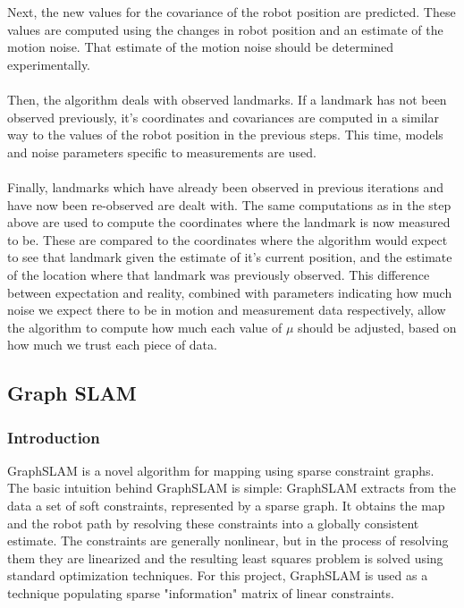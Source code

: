 \documentclass{ba-kecs}
\numberwithin{figure}{section}
\numberwithin{equation}{section}
\begin{document}
Next, the new values for the covariance of the robot position are predicted. These values are computed using the changes in robot position and an estimate of the motion noise. That estimate of the motion noise should be determined experimentally.\\\\
Then, the algorithm deals with observed landmarks. If a landmark has not been observed previously, it’s coordinates and covariances are computed in a similar way to the values of the robot position in the previous steps. This time, models and noise parameters specific to measurements are used.\\\\
Finally, landmarks which have already been observed in previous iterations and have now been re-observed are dealt with. The same computations as in the step above are used to compute the coordinates where the landmark is now measured to be. These are compared to the coordinates where the algorithm would expect to see that landmark given the estimate of it’s current position, and the estimate of the location where that landmark was previously observed. This difference between expectation and reality, combined with parameters indicating how much noise we expect there to be in motion and measurement data respectively, allow the algorithm to compute how much each value of $\mu$ should be adjusted, based on how much we trust each piece of data.\\

\subsection{Graph SLAM}

\subsubsection{Introduction}
GraphSLAM is a novel algorithm for mapping using sparse constraint graphs. The basic intuition behind GraphSLAM is simple: GraphSLAM extracts from the data a set of soft constraints, represented by a sparse graph. It obtains the map and the robot path by resolving these constraints into a globally consistent estimate. The constraints are generally nonlinear, but in the process of resolving them they are linearized and the resulting least squares problem is solved using standard optimization techniques\cite{sik}. For this project, GraphSLAM is used as a technique populating sparse "information" matrix of linear constraints.
\end{document}
